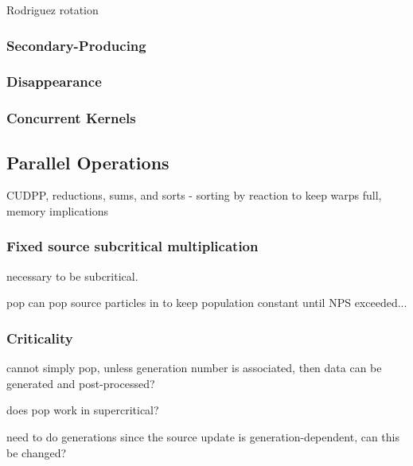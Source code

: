 Rodriguez rotation

\subsubsection{Secondary-Producing}


\subsubsection{Disappearance}


\subsubsection{Concurrent Kernels}

\subsection{Parallel Operations}

CUDPP, reductions, sums, and sorts - sorting by reaction to keep warps full, memory implications

\subsubsection{Fixed source subcritical multiplication}

necessary to be subcritical.

pop can pop source particles in to keep population constant until NPS exceeded...

\subsubsection{Criticality}

cannot simply pop, unless generation number is associated, then data can be generated and post-processed?

does pop work in supercritical?

need to do generations since the source update is generation-dependent, can this be changed?





